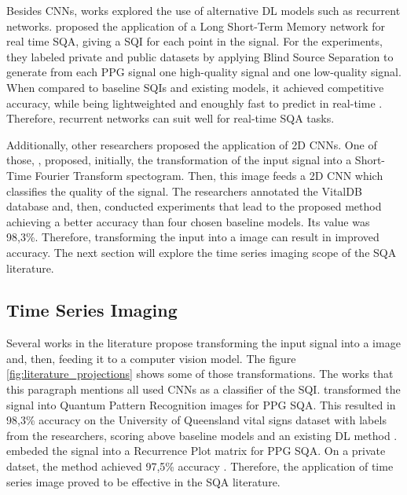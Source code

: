Besides \gls{CNN}s, works explored the use of alternative \gls{DL} models such as recurrent networks. \citeauthor{review-11} proposed the application of a Long Short-Term Memory network for real time \gls{SQA}, giving a \gls{SQI} for each point in the signal. For the experiments, they labeled private and public datasets by applying Blind Source Separation to generate from each \gls{PPG} signal one high-quality signal and one low-quality signal. When compared to baseline \gls{SQI}s and existing models, it achieved competitive accuracy, while being lightweighted and enoughly fast to predict in real-time \cite{review-11}. Therefore, recurrent networks can suit well for real-time \gls{SQA} tasks.

Additionally, other researchers proposed the application of 2D \gls{CNN}s. One of those, \citeauthor{review-12}, proposed, initially, the transformation of the input signal into a Short-Time Fourier Transform spectogram. Then, this image feeds a 2D \gls{CNN} which classifies the quality of the signal. The researchers annotated the VitalDB database and, then, conducted experiments that lead to the proposed method achieving a better accuracy than four chosen baseline models. Its value was 98,3\%. Therefore, transforming the input into a image can result in improved accuracy. The next section will explore the time series imaging scope of the \gls{SQA} literature.




\subsection{Time Series Imaging}
\label{sec:imaging}

Several works in the literature propose transforming the input signal into a image and, then, feeding it to a computer vision model. The figure \ref{fig:literature_projections} shows some of those transformations. The works that this paragraph mentions all used \gls{CNN}s as a classifier of the \gls{SQI}. \citeauthor{review-13} transformed the signal into Quantum Pattern Recognition images for PPG \gls{SQA}. This resulted in 98,3\% accuracy on the University of Queensland vital signs dataset with labels from the researchers, scoring above baseline models and an existing \gls{DL} method \cite{review-13}. \citeauthor{review-15} embeded the signal into a Recurrence Plot matrix for PPG \gls{SQA}. On a private datset, the method achieved 97,5\% accuracy \cite{review-15}. Therefore, the application of time series image proved to be effective in the \gls{SQA} literature.  

